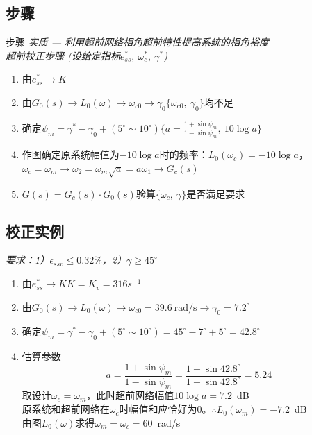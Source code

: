 \documentclass[handout,cjkutf8,table,aspectratio=1610]{beamer} %
\begin{document}
\subsection{步骤}
\begin{frame}{步骤}
	\emph{\color{red}实质 — 利用超前网络相角超前特性提高系统的相角裕度}\\
	\emph{超前校正步骤 (设给定指标$e_{ss}^*,~\omega_c^*,~\gamma^*$)}
	\begin{enumerate}[(1)]
		\item 由$e_{ss}^*\rightarrow K$
		\item 由$G_0(s)\rightarrow L_0(\omega)\rightarrow \omega_{c0}\rightarrow\gamma_0\{\omega_{c0},~\gamma_0\}$均不足
		\item 确定$\psi_m=\gamma^*-\gamma_0+(5^\circ\sim10^\circ)\{a=\frac{1+\sin\psi_m}{1-\sin\psi_m},~10\log a\}$
		\item 作图确定原系统幅值为$-10\log a$时的频率：$L_0(\omega_c)=-10\log a$，$\omega_c=\omega_m\rightarrow\omega_2=\omega_m\sqrt{a}=a\omega_1\rightarrow G_c(s)$
		\item $G(s) = G_c(s)\cdot G_0(s)$验算$\{\omega_c,~\gamma\}$是否满足要求
	\end{enumerate}
\end{frame}

\subsection{校正实例}
\begin{frame}{}
	\emph{要求：1）$\epsilon_{ssv}\le 0.32\%$，2）$\gamma \ge 45^\circ$}
	\begin{enumerate}[(1)]
		\item 由$e_{ss}^*\rightarrow K$\quad$K=K_v=316s^{-1}$
		\item 由$G_0(s)\rightarrow L_0(\omega)\rightarrow \omega_{c0}=39.6~\text{rad/s}\rightarrow\gamma_0=7.2^\circ$
		\item 确定$\psi_m=\gamma^*-\gamma_0+(5^\circ\sim10^\circ) = 45^\circ - 7^\circ + 5^\circ = 42.8^\circ$
		\item 估算参数
		$$a = \frac{1 + \sin\psi_m}{1-\sin\psi_m} = \frac{1+\sin42.8^\circ}{1-\sin42.8^\circ} = 5.24$$
		取设计$\omega_c=\omega_m$，此时超前网络幅值$10\log a = 7.2$~dB\\
		原系统和超前网络在$\omega_c$时幅值和应恰好为0。$\therefore L_0(\omega_m) = -7.2$~dB\\
		由图$L_0(\omega)$求得$\omega_m=\omega_c=60$~rad/s\\
	\end{enumerate}
\end{frame}
\end{document}

